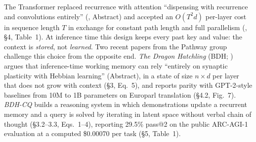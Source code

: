 \documentclass[11pt]{article}
\theoremstyle{remark}
\begin{document}
The Transformer \citep{vaswani2017attention} replaced recurrence with attention ``dispensing with recurrence and
convolutions entirely'' (\citealp{vaswani2017attention}, Abstract) and accepted an $O(T^2 d)$ per-layer cost in
sequence length $T$ in exchange for constant path length and full parallelism (\citealp{vaswani2017attention},
\S4, Table~1). At inference time this design keeps every past key and value: the context is \emph{stored},
not \emph{learned}. Two recent papers from the Pathway group challenge this choice from the opposite end.
\emph{The Dragon Hatchling} (BDH; \citealp{kosowski2025bdh}) argues that inference-time working memory can rely
``entirely on synaptic plasticity with Hebbian learning'' (Abstract), in a state of size $n\times d$ per layer that
does not grow with context (\S3, Eq.~5), and reports parity with GPT-2-style baselines from 10M to 1B parameters on
Europarl translation (\S4.2, Fig.~7). \emph{BDH-CQ} \citep{engdahl2026bdhcq} builds a reasoning system in which
demonstrations update a recurrent memory and a query is solved by iterating in latent space without verbal chain of
thought (\S3.2--3.3, Eqs.~1--4), reporting 29.5\% pass@2 on the public ARC-AGI-1 evaluation at a computed
\$0.00070 per task (\S5, Table~1).
\end{document}

